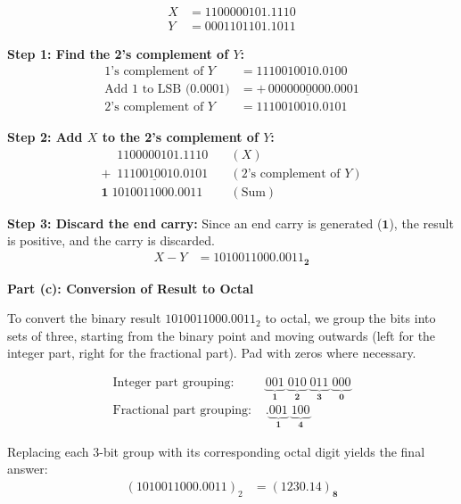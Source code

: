 \documentclass[12pt,a3paper]{article}
\begin{document}
\begin{enumerate}
\begin{tcolorbox}[enhanced,breakable,ansbox,colback=cD!4,colframe=cD,boxrule=0.8pt,arc=5pt,title={\textbf{Answer}},fonttitle=\bfseries\color{white},colbacktitle=cD]
\begin{align*}
    X &= 1100000101.1110 \\
    Y &= 0001101101.1011
\end{align*}

\textbf{Step 1: Find the 2's complement of $Y$:}
\begin{align*}
    \text{1's complement of } Y &= 1110010010.0100 \\
    \text{Add 1 to LSB (} 0.0001 \text{)} &= \underline{+\,0000000000.0001} \\
    \text{2's complement of } Y &= 1110010010.0101
\end{align*}

\textbf{Step 2: Add $X$ to the 2's complement of $Y$:}
\begin{align*}
    \phantom{+1}1100000101.1110 \quad &(X) \\
    \underline{+\phantom{1}1110010010.0101} \quad &(\text{2's complement of } Y) \\
    \mathbf{1}\;1010011000.0011 \quad &(\text{Sum})
\end{align*}

\textbf{Step 3: Discard the end carry:}
Since an end carry is generated ($\mathbf{1}$), the result is positive, and the carry is discarded.
\begin{align*}
    X - Y &= \mathbf{1010011000.0011_2}
\end{align*}

\vspace{1em}
\textbf{\textcolor{cD}{Part (c): Conversion of Result to Octal}}

To convert the binary result $1010011000.0011_2$ to octal, we group the bits into sets of three, starting from the binary point and moving outwards (left for the integer part, right for the fractional part). Pad with zeros where necessary.

\begin{align*}
    \text{Integer part grouping: } & \underbrace{001}_{\mathbf{1}} \; \underbrace{010}_{\mathbf{2}} \; \underbrace{011}_{\mathbf{3}} \; \underbrace{000}_{\mathbf{0}} \\
    \text{Fractional part grouping: } & .\underbrace{001}_{\mathbf{1}} \; \underbrace{100}_{\mathbf{4}}
\end{align*}

Replacing each 3-bit group with its corresponding octal digit yields the final answer:
\begin{align*}
    (1010011000.0011)_2 &= \mathbf{(1230.14)_8}
\end{align*}


\end{tcolorbox}
\end{enumerate}
\end{document}
